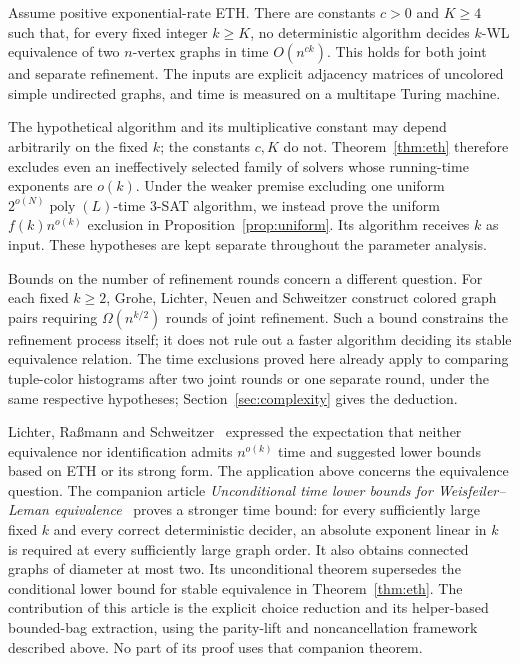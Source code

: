 \begin{theorem}\label{thm:eth}
Assume positive exponential-rate ETH. There are constants \(c>0\)
and \(K\ge4\) such that, for every fixed integer \(k\ge K\), no
deterministic algorithm decides \(k\)-WL equivalence of two
\(n\)-vertex graphs in time \(O(n^{ck})\).
This holds for both joint and separate refinement. The inputs are
explicit adjacency matrices of uncolored simple undirected graphs,
and time is measured on a multitape Turing machine.
\end{theorem}

The hypothetical algorithm and its multiplicative constant may depend
arbitrarily on the fixed \(k\); the constants \(c,K\) do not.
Theorem~\ref{thm:eth} therefore excludes even an ineffectively selected
family of solvers whose running-time exponents are \(o(k)\).
Under the weaker premise excluding one
uniform \(2^{o(N)}\operatorname{poly}(L)\)-time \(3\)-SAT algorithm, we
instead prove the uniform \(f(k)n^{o(k)}\) exclusion in
Proposition~\ref{prop:uniform}. Its algorithm receives \(k\) as input.
These hypotheses are kept separate throughout the parameter analysis.

Bounds on the number of refinement rounds concern a different question.
For each fixed \(k\ge2\), Grohe, Lichter, Neuen and Schweitzer
\citep[preprint version, Theorem~1 and Corollary~34]{GLNS2025}
construct colored graph pairs requiring \(\Omega(n^{k/2})\) rounds of
joint refinement. Such a bound constrains the refinement process itself;
it does not rule out a faster algorithm deciding its stable equivalence
relation.
The time exclusions proved here already apply to comparing tuple-color
histograms after two joint rounds or one separate round, under the same
respective hypotheses; Section~\ref{sec:complexity} gives the deduction.

Lichter, Ra{\ss}mann and Schweitzer~\citep[Section~6]{LRS2025}
expressed the expectation that neither equivalence nor identification
admits \(n^{o(k)}\) time and suggested lower bounds based on ETH or
its strong form.
The application above concerns the equivalence question.
The companion article \emph{Unconditional time lower bounds for
Weisfeiler--Leman equivalence}~\citep[Theorem~1.1]{CompanionUnconditional}
proves a stronger time bound: for every sufficiently large fixed \(k\)
and every correct deterministic decider, an absolute exponent linear
in \(k\) is required at every sufficiently large graph order.
It also obtains connected graphs of diameter at most two.
Its unconditional theorem supersedes the conditional lower bound for
stable equivalence in Theorem~\ref{thm:eth}.
The contribution of this article is the explicit choice reduction
and its helper-based bounded-bag extraction, using the parity-lift and
noncancellation framework described above. No part of its proof uses
that companion theorem.

